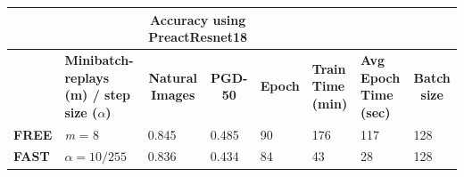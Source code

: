 \documentclass{article}
\begin{document}
\begin{table}[hbt!]
\begin{tabular}{|l|p{2.1cm}|c|l|l|l|l|l|}
\hline
              & \multicolumn{1}{l|}{}         &
              \multicolumn{2}{c|}{\textbf{Accuracy using PreactResnet18}}
              & \multicolumn{3}{l|}{\textbf{}}
              & \textbf{}                                \\ \hline
 & \textbf{Minibatch-replays (m) / step size ($\alpha$)} & \textbf{Natural
 Images}                      & \multicolumn{1}{c|}{\textbf{PGD-50}} &
 \multicolumn{1}{c|}{\textbf{Epoch}} & \multicolumn{1}{p{1cm}|}{\textbf{Train
 Time (min)}} & \multicolumn{1}{p{1cm}|}{\textbf{Avg Epoch Time (sec)}} &
 \multicolumn{1}{c|}{\textbf{Batch size}} \\ \hline
\textbf{FREE} & \textit{m} = 8 & \multicolumn{1}{l|}{0.845} & { 0.485}         & { 90}
& { 176}                     & { 117}                         & { 128}
\\ \hline
\textbf{FAST} & $\alpha = 10/255$       & \multicolumn{1}{l|}{0.836} & { 0.434}
& { 84}           & { 43}                     & { 28}                         &
{ 128}               \\ \hline
\end{tabular}
\end{table}
\end{document}
